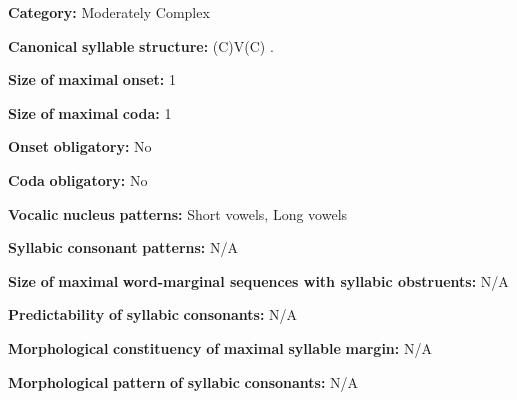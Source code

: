 \begin{styleBody}
\textbf{Category:} Moderately Complex
\end{styleBody}

\begin{styleBody}
\textbf{Canonical} \textbf{syllable} \textbf{structure:} (C)V(C) \citep[18-21]{Broadwell2006}.
\end{styleBody}

\begin{styleBody}
\textbf{Size} \textbf{of} \textbf{maximal} \textbf{onset:} 1
\end{styleBody}

\begin{styleBody}
\textbf{Size} \textbf{of} \textbf{maximal} \textbf{coda:} 1
\end{styleBody}

\begin{styleBody}
\textbf{Onset} \textbf{obligatory:} No
\end{styleBody}

\begin{styleBody}
\textbf{Coda} \textbf{obligatory:} No
\end{styleBody}

\begin{styleBody}
\textbf{Vocalic} \textbf{nucleus} \textbf{patterns:} Short vowels, Long vowels
\end{styleBody}

\begin{styleBody}
\textbf{Syllabic} \textbf{consonant} \textbf{patterns:} N/A
\end{styleBody}

\begin{styleBody}
\textbf{Size} \textbf{of} \textbf{maximal} \textbf{word{}-marginal sequences with syllabic obstruents:} N/A
\end{styleBody}

\begin{styleBody}
\textbf{Predictability} \textbf{of} \textbf{syllabic} \textbf{consonants:} N/A
\end{styleBody}

\begin{styleBody}
\textbf{Morphological} \textbf{constituency} \textbf{of} \textbf{maximal} \textbf{syllable} \textbf{margin:} N/A
\end{styleBody}

\begin{styleBody}
\textbf{Morphological} \textbf{pattern} \textbf{of} \textbf{syllabic} \textbf{consonants:} N/A
\end{styleBody}

